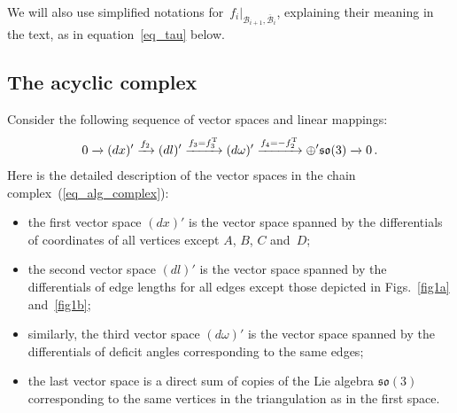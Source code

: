 \begin{remark}\label{rem1B}
We will also use simplif\/ied notations for~$f_i|_{\mathcal B_{i+1}, \overline{\mathcal B}_i}$, explaining their meaning in the text, as in equation~\eqref{eq_tau} below.
\end{remark}

\subsection{The acyclic complex}

Consider the following sequence of vector spaces and linear mappings:
\begin{equation}
0\xrightarrow{} (dx)'\xrightarrow{f_2} (dl)' \xrightarrow{f_3=f_3^{\rm T}}(d\omega)' \xrightarrow{f_4=-f_2^{\rm T}} \oplus' \mathfrak{so}(3) \xrightarrow{} 0\,.
\label{eq_alg_complex}
\end{equation}
Here is the detailed description of the vector spaces in the chain complex~(\ref{eq_alg_complex}):
\begin{itemize}
\itemsep=0pt
  \item the f\/irst vector space $(dx)'$ is the vector space spanned by the dif\/ferentials of coordinates of all vertices except $A$, $B$, $C$ and~$D$;
  \item the second vector space $(dl)'$ is the vector space spanned by the dif\/ferentials of edge lengths for all edges except those depicted in Figs.~\ref{fig1a} and~\ref{fig1b};
  \item similarly, the third vector space $(d\omega)'$ is the vector space spanned by the dif\/ferentials of def\/icit angles corresponding to the same edges;
  \item the last vector space is a direct sum of copies of the Lie algebra $\mathfrak{so}(3)$ corresponding to the same vertices in the triangulation as in the f\/irst space.
\end{itemize}


